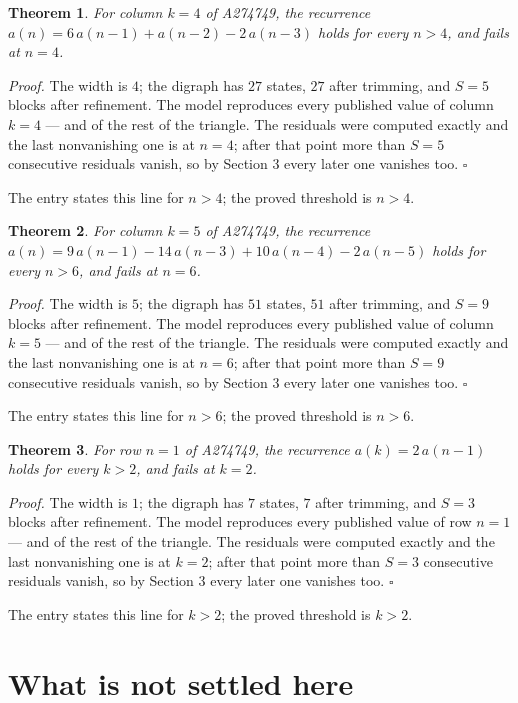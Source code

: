 \documentclass[11pt]{article}
\newtheorem{theorem}{Theorem}
\theoremstyle{definition}
\begin{document}
\begin{theorem} For column $k = 4$ of A274749, the recurrence $a(n) = 6\,a(n-1) + a(n-2) - 2\,a(n-3)$ holds for every $n > 4$, and fails at $n = 4$.\end{theorem}

{\itshape Proof.} The width is $4$; the digraph has $27$ states, $27$ after trimming, and $S = 5$ blocks after refinement. The model reproduces every published value of column $k = 4$ --- and of the rest of the triangle. The residuals were computed exactly and the last nonvanishing one is at $n = 4$; after that point more than $S = 5$ consecutive residuals vanish, so by Section 3 every later one vanishes too. $\square$

The entry states this line for $n > 4$; the proved threshold is $n > 4$.

\begin{theorem} For column $k = 5$ of A274749, the recurrence $a(n) = 9\,a(n-1) - 14\,a(n-3) + 10\,a(n-4) - 2\,a(n-5)$ holds for every $n > 6$, and fails at $n = 6$.\end{theorem}

{\itshape Proof.} The width is $5$; the digraph has $51$ states, $51$ after trimming, and $S = 9$ blocks after refinement. The model reproduces every published value of column $k = 5$ --- and of the rest of the triangle. The residuals were computed exactly and the last nonvanishing one is at $n = 6$; after that point more than $S = 9$ consecutive residuals vanish, so by Section 3 every later one vanishes too. $\square$

The entry states this line for $n > 6$; the proved threshold is $n > 6$.

\begin{theorem} For row $n = 1$ of A274749, the recurrence $a(k) = 2\,a(n-1)$ holds for every $k > 2$, and fails at $k = 2$.\end{theorem}

{\itshape Proof.} The width is $1$; the digraph has $7$ states, $7$ after trimming, and $S = 3$ blocks after refinement. The model reproduces every published value of row $n = 1$ --- and of the rest of the triangle. The residuals were computed exactly and the last nonvanishing one is at $k = 2$; after that point more than $S = 3$ consecutive residuals vanish, so by Section 3 every later one vanishes too. $\square$

The entry states this line for $k > 2$; the proved threshold is $k > 2$.

\section{What is not settled here}
\end{document}
